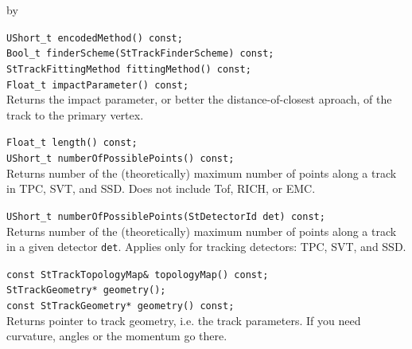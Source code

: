 \documentclass[twoside]{article}
\newcommand{\entrylabel}[1]{\mbox{\textbf{{#1}}}\hfil}%
\newenvironment{entry}
{\begin{list}{}%
    {\renewcommand{\makelabel}{\entrylabel}%
     \setlength{\labelwidth}{90pt}%
     \setlength{\leftmargin}{\labelwidth}
     \advance\leftmargin by \labelsep%
      }%
    }%
  {\end{list}}
\newcommand{\Entrylabel}[1]%
{\raisebox{0pt}[1ex][0pt]{\makebox[\labelwidth][l]%
    {\parbox[t]{\labelwidth}{\hspace{0pt}\textbf{{#1}}}}}}
\newenvironment{Entry}%
{\renewcommand{\entrylabel}{\Entrylabel}\begin{entry}}%
  {\end{entry}}
\begin{document}
\begin{Entry}
    \verb+UShort_t encodedMethod() const;+\\

    \verb+Bool_t finderScheme(StTrackFinderScheme) const;+\\

    \verb+StTrackFittingMethod fittingMethod() const;+\\

    \verb+Float_t impactParameter() const;+\\
    Returns the impact parameter, or better the distance-of-closest
    aproach, of the track to the primary vertex.
    
    \verb+Float_t length() const;+\\

    \verb+UShort_t numberOfPossiblePoints() const;+\\
    Returns number of the (theoretically) maximum number of
    points along a track in TPC, SVT, and SSD. Does not include
    Tof, RICH, or EMC.
    
    \verb+UShort_t numberOfPossiblePoints(StDetectorId det) const;+\\
    Returns number of the (theoretically) maximum number of
    points along a track in a given detector \texttt{det}.
    Applies only for tracking detectors: TPC, SVT, and SSD.

    \verb+const StTrackTopologyMap& topologyMap() const;+\\

    \verb+StTrackGeometry* geometry();+\\
    \verb+const StTrackGeometry* geometry() const;+\\
    Returns pointer to track geometry, i.e. the track parameters.
    If you need curvature, angles or the momentum go there.
    

\end{Entry}
\end{document}
